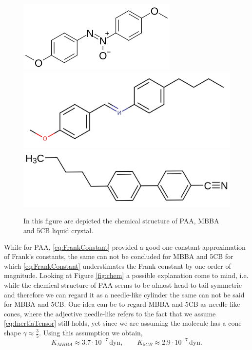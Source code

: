 \documentclass[%
 aip,
 amsmath,amssymb,
 reprint,%
]{revtex4-1}
\begin{document}
\begin{figure}
  \includegraphics[scale=0.4]{Figures/PAA}\\
  \includegraphics[scale=0.11]{Figures/MBBA}
  \includegraphics[scale=0.085]{Figures/5CB}
  \caption{In this figure are depicted the chemical structure of PAA, MBBA and 5CB liquid crystal.}
\end{figure}

While for PAA, \eqref{eq:FrankConstant} provided a good one constant approximation of Frank's constants, the same can not be concluded for MBBA and 5CB for which \eqref{eq:FrankConstant} understimates the Frank constant by one order of magnitude.
Looking at Figure \ref{fig:chem} a possible explanation come to mind, i.e. while the chemical structure of PAA seems to be almost head-to-tail symmetric and therefore we can regard it as a needle-like cylinder the same can not be said for MBBA and 5CB.
One idea can be to regard MBBA and 5CB as needle-like cones, where the adjective needle-like refers to the fact that we assume \eqref{eq:InertiaTensor} still holds, yet since we are assuming the molecule has a cone shape $\gamma\approx\frac{3}{5}$.
Using this assumption we obtain,
\begin{equation}
  K_{MBBA} \approx 3.7 \cdot 10^{-7}\,\text{dyn}, \qquad K_{5CB}\approx 2.9\cdot 10^{-7}\,\text{dyn}.
\end{equation}

\end{document}
